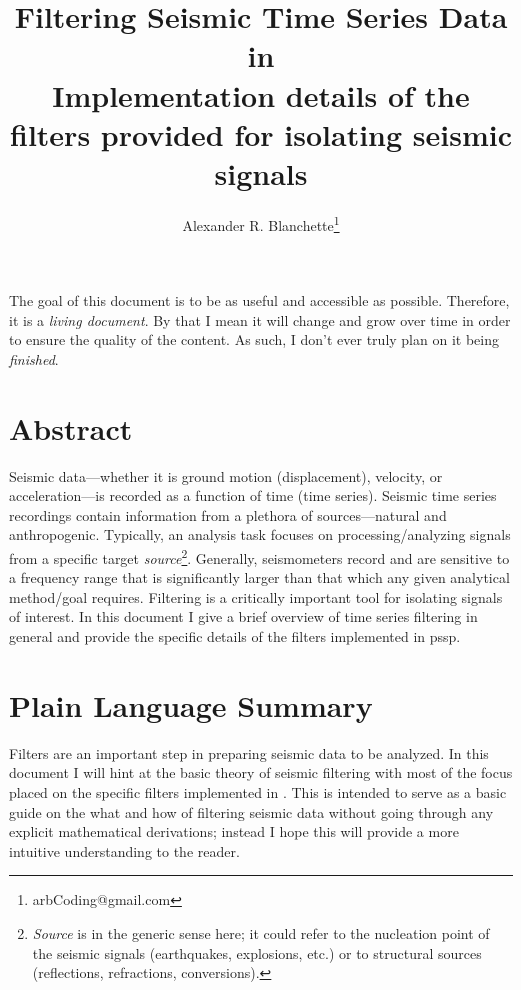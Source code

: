 \documentclass[american, twoside]{article}
\title{\Huge Filtering Seismic Time Series Data in \glsxtrfull{pssp}\\
\large Implementation details of the filters provided for isolating seismic signals}
\author{Alexander R. Blanchette\thanks{arbCoding@gmail.com}}
\date{\Today}
\begin{document}
\maketitle
\pagestyle{fancy}
\scriptsize The goal of this document is to be as useful and accessible as possible. Therefore, it is a \textit{living document}. By that I mean
it will change and grow over time in order to ensure the quality of the content. As such, I don't ever truly plan on it being
\textit{finished}.
\normalsize

\begin{tcolorbox}[enhanced]
    \section*{Abstract} \label{Abstract}
    Seismic data---whether it is ground motion (displacement), velocity, or acceleration---is recorded as a function of time (time series). Seismic time series
    recordings contain information from a plethora of sources---natural and anthropogenic. Typically, an analysis task focuses on processing/analyzing
    signals from a specific target \textit{source}\footnote{\textit{Source} is in the generic sense here; it could refer to the nucleation point of the seismic
    signals (earthquakes, explosions, etc.) or to structural sources (reflections, refractions, conversions).}. Generally, seismometers record and are sensitive
    to a frequency range that is significantly larger than that which any given analytical method/goal requires. Filtering is a critically important tool for
    isolating signals of interest. In this document I give a brief overview of time series filtering in general and provide the specific details of the filters
    implemented in \gls{pssp}.
    \section*{Plain Language Summary} \label{PlainSummary}
    Filters are an important step in preparing seismic data to be analyzed. In this document I will hint at the basic theory of seismic filtering
    with most of the focus placed on the specific filters implemented in . This is intended to serve as a basic guide on the what and how of filtering seismic data without going through
    any explicit mathematical derivations; instead I hope this will provide a more intuitive understanding to the reader.
\end{tcolorbox}
\end{document}
